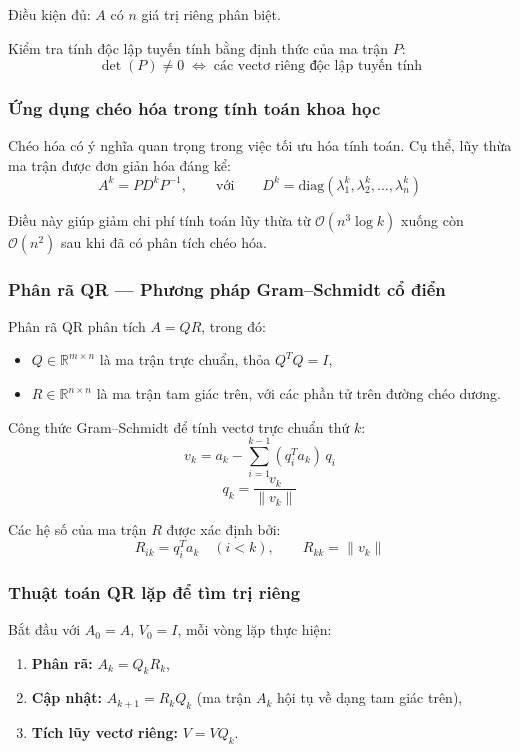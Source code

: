 \documentclass[a4paper,12pt]{report}
\begin{document}
\smallskip

\noindent Điều kiện đủ: $A$ có $n$ giá trị riêng phân biệt.

\smallskip

\noindent Kiểm tra tính độc lập tuyến tính bằng định thức của ma trận $P$:
\[
  \det(P) \neq 0 \;\Longleftrightarrow\; \text{các vectơ riêng độc lập tuyến tính}
\]

\subsubsection{Ứng dụng chéo hóa trong tính toán khoa học}
Chéo hóa có ý nghĩa quan trọng trong việc tối ưu hóa tính toán. Cụ thể, lũy thừa ma trận được đơn giản hóa đáng kể:
\[
  A^k = P D^k P^{-1}, \qquad \text{với} \qquad
  D^k = \mathrm{diag}(\lambda_1^k, \lambda_2^k, \ldots, \lambda_n^k)
\]

\noindent Điều này giúp giảm chi phí tính toán lũy thừa từ $\mathcal{O}(n^3 \log k)$ xuống còn $\mathcal{O}(n^2)$ sau khi đã có phân tích chéo hóa.

\subsubsection{Phân rã QR --- Phương pháp Gram--Schmidt cổ điển}
Phân rã QR phân tích $A = QR$, trong đó:
\begin{itemize}
  \item $Q \in \mathbb{R}^{m \times n}$ là ma trận trực chuẩn, thỏa $Q^T Q = I$,
  \item $R \in \mathbb{R}^{n \times n}$ là ma trận tam giác trên, với các phần tử trên đường chéo dương.
\end{itemize}

Công thức Gram--Schmidt để tính vectơ trực chuẩn thứ $k$:
\[
  v_k = a_k - \sum_{i=1}^{k-1} (q_i^T a_k)\, q_i
\]
\[
  q_k = \frac{v_k}{\|v_k\|}
\]

Các hệ số của ma trận $R$ được xác định bởi:
\[
  R_{ik} = q_i^T a_k \quad (i < k), \qquad
  R_{kk} = \|v_k\|
\]

\subsubsection{Thuật toán QR lặp để tìm trị riêng}
Bắt đầu với $A_0 = A$, $V_0 = I$, mỗi vòng lặp thực hiện:
\begin{enumerate}
  \item \textbf{Phân rã:} $A_k = Q_k R_k$,
  \item \textbf{Cập nhật:} $A_{k+1} = R_k Q_k$ \quad (ma trận $A_k$ hội tụ về dạng tam giác trên),
  \item \textbf{Tích lũy vectơ riêng:} $V = V Q_k$.
\end{enumerate}
\end{document}
